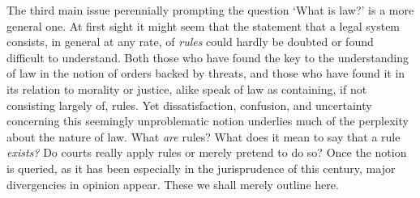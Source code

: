 \documentclass[12pt,oneside]{book}  %
\begin{document}
The third main issue perennially prompting the question `What is law?'
is a more general one. At first sight it might seem that the statement
that a legal system consists, in general at any rate, of \emph{rules}
could hardly be doubted or found difficult to understand. Both those who
have found the key to the understanding of law in the notion of orders
backed by threats, and those who have found it in its relation to
morality or justice, alike speak of law as containing, if not consisting
largely of, rules. Yet dissatisfaction, confusion, and uncertainty
concerning this seemingly unproblematic notion underlies much of the
perplexity about the nature of law. What \emph{are} rules? What does it
mean to say that a rule \emph{exists?} Do courts really apply rules or
merely pretend to do so? Once the notion is queried, as it has been
especially in the jurisprudence of this century, major divergencies in
opinion appear. These we shall merely outline here.
\end{document}
